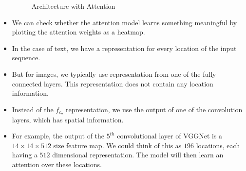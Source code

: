 \documentclass[a4paper]{article}
\begin{document}
\begin{itemize}
\begin{figure}[H]
        \caption{Architecture with Attention}
    \end{figure}
    \item We can check whether the attention model learns something meaningful by plotting the attention weights as a heatmap.
    \item In the case of text, we have a representation for every location of the input sequence.
    \item But for images, we typically use representation from one of the fully connected layers. This representation does not contain any location information.
    \item Instead of the $f_{c_7}$ representation, we use the output of one of the convolution layers, which has spatial information.
    \item For example, the output of the $5^{th}$ convolutional layer of VGGNet is a $14 \times 14 \times 512$ size feature map. We could think of this as $196$ locations, each having a $512$ dimensional representation. The model will then learn an attention over these locations.
\end{itemize}
\end{document}
